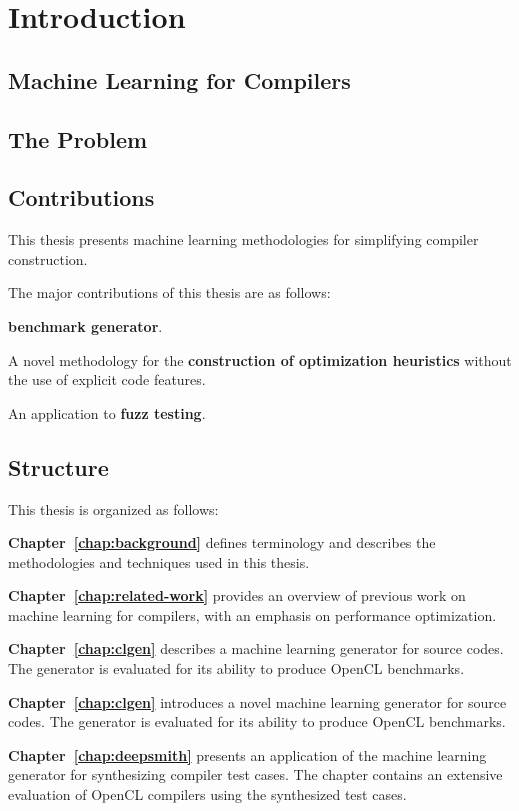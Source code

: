 \chapter{Introduction}

\lipsum[1-2]

\section{Machine Learning for Compilers}

\section{The Problem}

\section{Contributions}

This thesis presents machine learning methodologies for simplifying compiler construction.

The major contributions of this thesis are as follows:

\textbf{benchmark generator}.

A novel methodology for the \textbf{construction of optimization heuristics} without the use of explicit code features.

An application to \textbf{fuzz testing}.

\section{Structure}

This thesis is organized as follows:

\textbf{Chapter~\ref{chap:background}} defines terminology and describes the  methodologies and techniques used in this thesis.

\textbf{Chapter~\ref{chap:related-work}} provides an overview of previous work on machine learning for compilers, with an emphasis on performance optimization.

\textbf{Chapter~\ref{chap:clgen}} describes a machine learning generator for source codes. The generator is evaluated for its ability to produce OpenCL benchmarks.

\textbf{Chapter~\ref{chap:clgen}} introduces a novel machine learning generator for source codes. The generator is evaluated for its ability to produce OpenCL benchmarks.

\textbf{Chapter~\ref{chap:deepsmith}} presents an application of the machine learning generator for synthesizing compiler test cases. The chapter contains an extensive evaluation of OpenCL compilers using the synthesized test cases.

